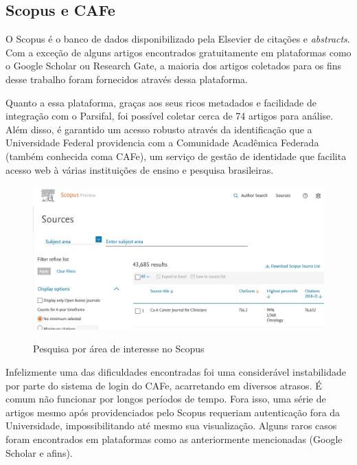 \subsection{Scopus e CAFe}
O Scopus é o banco de dados disponibilizado pela Elsevier de citações e \textit{abstracts}. Com a exceção de alguns artigos encontrados gratuitamente em plataformas como o Google Scholar ou Research Gate, a maioria dos artigos coletados para os fins desse trabalho foram fornecidos através dessa plataforma.

Quanto a essa plataforma, graças aos seus ricos metadados e facilidade de integração com o Parsifal, foi possível coletar cerca de 74 artigos para análise. Além disso, é garantido um acesso robusto através da identificação que a Universidade Federal providencia com a Comunidade Acadêmica Federada (também conhecida coma CAFe), um serviço de gestão de identidade que facilita acesso web à várias instituições de ensino e pesquisa brasileiras. 

\begin{figure}[ht]
    \centering
    \caption{Pesquisa por área de interesse no Scopus}
    \includegraphics[width=14cm]{figuras/scopus.png} 
    \label{fig:internet} 
\end{figure}

\bigskip

Infelizmente uma das dificuldades encontradas foi uma considerável instabilidade por parte do sistema de login do CAFe, acarretando em diversos atrasos. É comum não funcionar por longos períodos de tempo. Fora isso, uma série de artigos mesmo após providenciados pelo Scopus requeriam autenticação fora da Universidade, impossibilitando até mesmo sua visualização. Alguns raros casos foram encontrados em plataformas como as anteriormente mencionadas (Google Scholar e afins).

